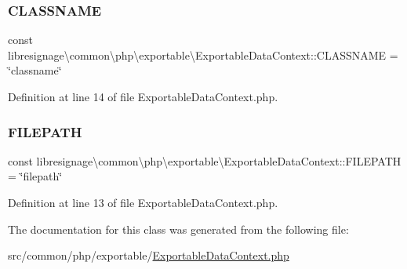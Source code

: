 \subsubsection{\texorpdfstring{C\+L\+A\+S\+S\+N\+A\+ME}{CLASSNAME}}
{\footnotesize\ttfamily const libresignage\textbackslash{}common\textbackslash{}php\textbackslash{}exportable\textbackslash{}\+Exportable\+Data\+Context\+::\+C\+L\+A\+S\+S\+N\+A\+ME = \char`\"{}classname\char`\"{}}



Definition at line 14 of file Exportable\+Data\+Context.\+php.

\mbox{\label{classlibresignage_1_1common_1_1php_1_1exportable_1_1ExportableDataContext_a70c4e4600d473d2993ff6ab7d0d23571}} 
\subsubsection{\texorpdfstring{F\+I\+L\+E\+P\+A\+TH}{FILEPATH}}
{\footnotesize\ttfamily const libresignage\textbackslash{}common\textbackslash{}php\textbackslash{}exportable\textbackslash{}\+Exportable\+Data\+Context\+::\+F\+I\+L\+E\+P\+A\+TH = \char`\"{}filepath\char`\"{}}



Definition at line 13 of file Exportable\+Data\+Context.\+php.



The documentation for this class was generated from the following file\+:\begin{DoxyCompactItemize}
\item 
src/common/php/exportable/\hyperlink{ExportableDataContext_8php}{Exportable\+Data\+Context.\+php}\end{DoxyCompactItemize}
